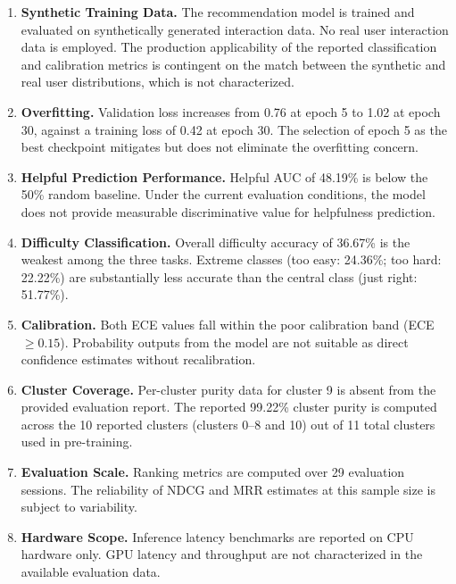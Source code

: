 \documentclass[12pt]{article}
\begin{document}
\begin{enumerate}
    \item \textbf{Synthetic Training Data.} The recommendation model is trained and evaluated on synthetically generated interaction data. No real user interaction data is employed. The production applicability of the reported classification and calibration metrics is contingent on the match between the synthetic and real user distributions, which is not characterized.

    \item \textbf{Overfitting.} Validation loss increases from 0.76 at epoch 5 to 1.02 at epoch 30, against a training loss of 0.42 at epoch 30. The selection of epoch 5 as the best checkpoint mitigates but does not eliminate the overfitting concern.

    \item \textbf{Helpful Prediction Performance.} Helpful AUC of 48.19\% is below the 50\% random baseline. Under the current evaluation conditions, the model does not provide measurable discriminative value for helpfulness prediction.

    \item \textbf{Difficulty Classification.} Overall difficulty accuracy of 36.67\% is the weakest among the three tasks. Extreme classes (too easy: 24.36\%; too hard: 22.22\%) are substantially less accurate than the central class (just right: 51.77\%).

    \item \textbf{Calibration.} Both ECE values fall within the poor calibration band (ECE $\geq 0.15$). Probability outputs from the model are not suitable as direct confidence estimates without recalibration.

    \item \textbf{Cluster Coverage.} Per-cluster purity data for cluster 9 is absent from the provided evaluation report. The reported 99.22\% cluster purity is computed across the 10 reported clusters (clusters 0--8 and 10) out of 11 total clusters used in pre-training.

    \item \textbf{Evaluation Scale.} Ranking metrics are computed over 29 evaluation sessions. The reliability of NDCG and MRR estimates at this sample size is subject to variability.

    \item \textbf{Hardware Scope.} Inference latency benchmarks are reported on CPU hardware only. GPU latency and throughput are not characterized in the available evaluation data.
\end{enumerate}
\end{document}
